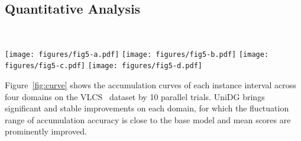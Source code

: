 \documentclass{article} \usepackage{iclr2024_conference,times}
\def\Model{UniDG }
\begin{document}
\subsection{Quantitative Analysis} ~\label{sec:exp:vis}
\begin{figure*}[t]
	\centering
	\caption{Accuracy accumulation curves on VLCS. \Model outperforms the base ERM model by about 5\% in accuracy. Note we randomly select \textbf{10 different trial seeds} for better comparison.}
	\vspace{-3mm}
	\label{fig:curve}
	{\texttt{[image: figures/fig5-a.pdf]}}
	{\texttt{[image: figures/fig5-b.pdf]}}
	{\texttt{[image: figures/fig5-c.pdf]}}
	{\texttt{[image: figures/fig5-d.pdf]}}
 \vspace{-3mm}
\end{figure*}
Figure~\ref{fig:curve} shows the accumulation curves of each instance interval across four domains on the VLCS~\citep{li2017deeper} dataset by 10 parallel trials. \Model brings significant and stable improvements on each domain, for which the fluctuation range of accumulation accuracy is close to the base model and mean scores are prominently improved.
\end{document}
